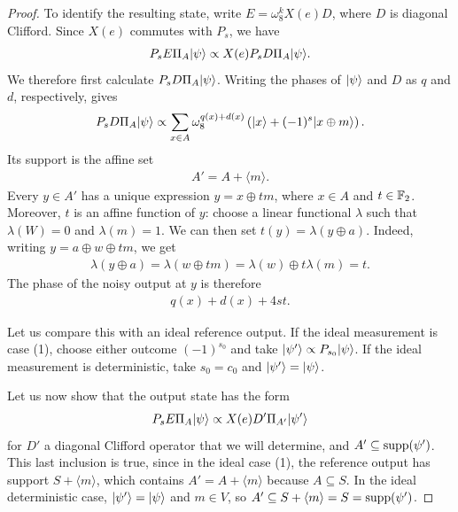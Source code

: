\begin{proof}
    To identify the resulting state, write $E=\omega_8^k X(e)D$, where $D$
    is diagonal Clifford. Since $X(e)$ commutes with $P_s$, we have
    \begin{align}
        P_sE\Pi_A|\psi\rangle
        \propto X(e)P_sD\Pi_A|\psi\rangle.
    \end{align}
    We therefore first calculate $P_sD\Pi_A|\psi\rangle$.
    Writing the phases of $|\psi\rangle$ and $D$ as $q$ and $d$,
    respectively, gives
    \begin{align}
        P_sD\Pi_A|\psi\rangle
        \propto
        \sum_{x\in A}\omega_8^{q(x)+d(x)}
        \left(|x\rangle+(-1)^s|x\oplus m\rangle\right).
    \end{align}
    Its support is the affine set
    \begin{align}
        A'=A+\langle m\rangle.
    \end{align}
    Every $y\in A'$ has a unique expression $y=x\oplus tm$, where $x\in A$ and $t\in\mathbb{F}_2$.
    Moreover, $t$ is an affine function of $y$: choose a linear functional $\lambda$ such that $\lambda(W)=0$ and $\lambda(m)=1$. We can then set $t(y)=\lambda(y\oplus a)$. Indeed, writing $y=a \oplus w \oplus tm$, we get
    \begin{align}
        \lambda(y\oplus a)
        =\lambda(w\oplus tm)
        =\lambda(w)\oplus t\lambda(m)
        =t.
    \end{align}
    The phase of the noisy output at $y$ is therefore
    \begin{align}
        q(x)+d(x)+4st.
    \end{align}

    Let us compare this with an ideal reference output.
    If the ideal measurement is case (1), choose either outcome
    $(-1)^{s_0}$ and take
    $|\psi'\rangle\propto P_{s_0}|\psi\rangle$.
    If the ideal measurement is deterministic, take $s_0=c_0$
    and $|\psi'\rangle=|\psi\rangle$.

    Let us now show that the output state has the form
    \begin{align}
        P_sE\Pi_A|\psi\rangle
        \propto X(e)D'\Pi_{A'}|\psi'\rangle
    \end{align}
    for $D'$ a diagonal Clifford operator that we will determine, and $A'\subseteq\operatorname{supp}(\psi')$. This last inclusion is true, since in the ideal case (1), the reference output has support $S+\langle m\rangle$, which contains
    $A'=A+\langle m\rangle$ because $A\subseteq S$.
    In the ideal deterministic case, $|\psi'\rangle=|\psi\rangle$
    and $m\in V$, so
    $A'\subseteq S+\langle m\rangle=S=\operatorname{supp}(\psi')$.



\end{proof}
